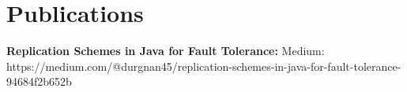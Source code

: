 \documentclass[letterpaper,11pt]{article}
\begin{document}
\section{Publications}
 \begin{itemize}[leftmargin=0.15in, label={}]
    \small{\item{
     \textbf{Replication Schemes in Java for Fault Tolerance:}{ Medium: https://medium.com/@durgnan45/replication-schemes-in-java-for-fault-tolerance-94684f2b652b} \\
    }}
 \end{itemize}


\end{document}
